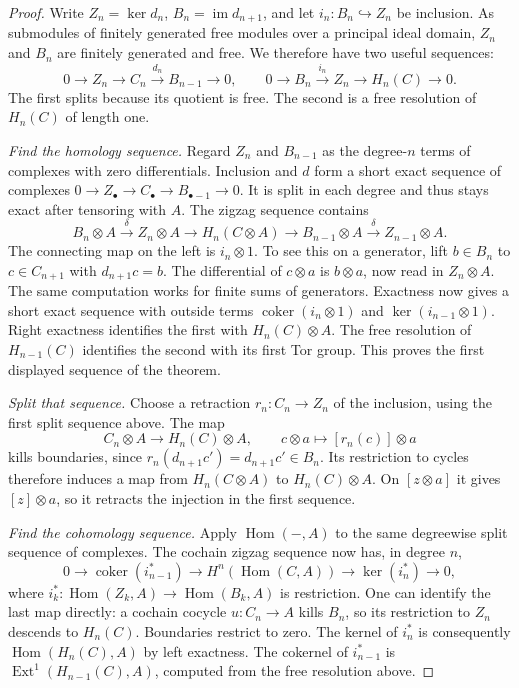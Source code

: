 \begin{proof}
Write $Z_n=\ker d_n$, $B_n=\operatorname{im}d_{n+1}$, and let $i_n:B_n\hookrightarrow Z_n$ be inclusion. As submodules of finitely generated free modules over a principal ideal domain, $Z_n$ and $B_n$ are finitely generated and free. We therefore have two useful sequences:
\[
0\to Z_n\to C_n\xrightarrow{d_n}B_{n-1}\to0,
\qquad
0\to B_n\xrightarrow{i_n}Z_n\to H_n(C)\to0.
\]
The first splits because its quotient is free. The second is a free resolution of $H_n(C)$ of length one.

\emph{Find the homology sequence.} Regard $Z_n$ and $B_{n-1}$ as the degree-$n$ terms of complexes with zero differentials. Inclusion and $d$ form a short exact sequence of complexes
$0\to Z_\bullet\to C_\bullet\to B_{\bullet-1}\to0$.
It is split in each degree and thus stays exact after tensoring with $A$. The zigzag sequence contains
\[
B_n\otimes A\xrightarrow{\delta}Z_n\otimes A
\longrightarrow H_n(C\otimes A)
\longrightarrow B_{n-1}\otimes A\xrightarrow{\delta}Z_{n-1}\otimes A.
\]
The connecting map on the left is $i_n\otimes1$. To see this on a generator, lift $b\in B_n$ to $c\in C_{n+1}$ with $d_{n+1}c=b$. The differential of $c\otimes a$ is $b\otimes a$, now read in $Z_n\otimes A$. The same computation works for finite sums of generators. Exactness now gives a short exact sequence with outside terms
$\operatorname{coker}(i_n\otimes1)$ and $\ker(i_{n-1}\otimes1)$.
Right exactness identifies the first with $H_n(C)\otimes A$. The free resolution of $H_{n-1}(C)$ identifies the second with its first Tor group. This proves the first displayed sequence of the theorem.

\emph{Split that sequence.} Choose a retraction $r_n:C_n\to Z_n$ of the inclusion, using the first split sequence above. The map
\[
C_n\otimes A\longrightarrow H_n(C)\otimes A,
\qquad c\otimes a\longmapsto[r_n(c)]\otimes a
\]
kills boundaries, since $r_n(d_{n+1}c')=d_{n+1}c'\in B_n$. Its restriction to cycles therefore induces a map from $H_n(C\otimes A)$ to $H_n(C)\otimes A$. On $[z\otimes a]$ it gives $[z]\otimes a$, so it retracts the injection in the first sequence.

\emph{Find the cohomology sequence.} Apply $\operatorname{Hom}(-,A)$ to the same degreewise split sequence of complexes. The cochain zigzag sequence now has, in degree $n$,
\[
0\to\operatorname{coker}(i_{n-1}^*)
\to H^n(\operatorname{Hom}(C,A))
\to\ker(i_n^*)\to0,
\]
where $i_k^*: \operatorname{Hom}(Z_k,A)\to\operatorname{Hom}(B_k,A)$ is restriction. One can identify the last map directly: a cochain cocycle $u:C_n\to A$ kills $B_n$, so its restriction to $Z_n$ descends to $H_n(C)$. Boundaries restrict to zero. The kernel of $i_n^*$ is consequently $\operatorname{Hom}(H_n(C),A)$ by left exactness. The cokernel of $i_{n-1}^*$ is $\operatorname{Ext}^1(H_{n-1}(C),A)$, computed from the free resolution above.


\end{proof}
